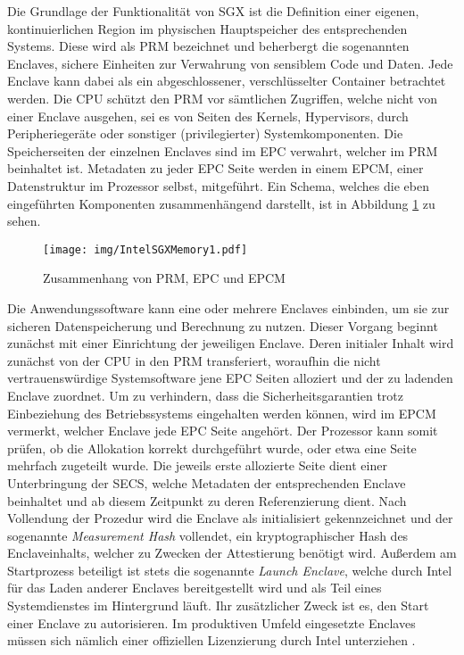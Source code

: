 Die Grundlage der Funktionalität von \ac{SGX} ist die Definition einer eigenen, kontinuierlichen Region im physischen Hauptspeicher des entsprechenden Systems. Diese wird als \ac{PRM} bezeichnet und beherbergt die sogenannten Enclaves, sichere Einheiten zur Verwahrung von sensiblem Code und Daten. Jede Enclave kann dabei als ein abgeschlossener, verschlüsselter Container betrachtet werden. Die \ac{CPU} schützt den \ac{PRM} vor sämtlichen Zugriffen, welche nicht von einer Enclave ausgehen, sei es von Seiten des Kernels, Hypervisors, durch Peripheriegeräte oder sonstiger (privilegierter) Systemkomponenten. Die Speicherseiten der einzelnen Enclaves sind im \ac{EPC} verwahrt, welcher im \ac{PRM} beinhaltet ist. Metadaten zu jeder \ac{EPC} Seite werden in einem \ac{EPCM}, einer Datenstruktur im Prozessor selbst, mitgeführt. Ein Schema, welches die eben eingeführten Komponenten zusammenhängend darstellt, ist in Abbildung \ref{fig:intelsgxmemory1} zu sehen.

\begin{figure}
	\texttt{[image: img/IntelSGXMemory1.pdf]}
	\centering
	\caption{Zusammenhang von PRM, EPC und EPCM}
	\label{fig:intelsgxmemory1}
\end{figure}

Die Anwendungssoftware kann eine oder mehrere Enclaves einbinden, um sie zur sicheren Datenspeicherung und Berechnung zu nutzen. Dieser Vorgang beginnt zunächst mit einer Einrichtung der jeweiligen Enclave. Deren initialer Inhalt wird zunächst von der \ac{CPU} in den \ac{PRM} transferiert, woraufhin die nicht vertrauenswürdige Systemsoftware jene \ac{EPC} Seiten alloziert und der zu ladenden Enclave zuordnet. Um zu verhindern, dass die Sicherheitsgarantien trotz Einbeziehung des Betriebssystems eingehalten werden können, wird im \ac{EPCM} vermerkt, welcher Enclave jede EPC Seite angehört. Der Prozessor kann somit prüfen, ob die Allokation korrekt durchgeführt wurde, oder etwa eine Seite mehrfach zugeteilt wurde. Die jeweils erste allozierte Seite dient einer Unterbringung der \ac{SECS}, welche Metadaten der entsprechenden Enclave beinhaltet und ab diesem Zeitpunkt zu deren Referenzierung dient. Nach Vollendung der Prozedur wird die Enclave als initialisiert gekennzeichnet und der sogenannte \textit{Measurement Hash} vollendet, ein kryptographischer Hash des Enclaveinhalts, welcher zu Zwecken der Attestierung benötigt wird. Außerdem am Startprozess beteiligt ist stets die sogenannte \textit{Launch Enclave}, welche durch Intel für das Laden anderer Enclaves bereitgestellt wird und als Teil eines Systemdienstes im Hintergrund läuft. Ihr zusätzlicher Zweck ist es, den Start einer Enclave zu autorisieren. Im produktiven Umfeld eingesetzte Enclaves müssen sich nämlich einer offiziellen Lizenzierung durch Intel unterziehen \cite{Costan2016}.

